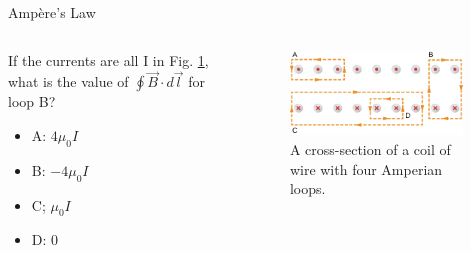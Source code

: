 \documentclass{beamer}
\begin{document}
\begin{frame}{Amp\`{e}re's Law}
\begin{columns}[T]
\begin{column}{0.5\textwidth}
\small
If the currents are all I in Fig. \ref{fig:ampQuestion3}, what is the value of $\oint \vec{B} \cdot d\vec{l}$ for loop B?
\begin{itemize}
\item A: $4\mu_0 I$
\item B: $-4\mu_0 I$
\item C; $\mu_0 I$
\item D: $0$
\end{itemize}
\end{column}
\begin{column}{0.5\textwidth}
\begin{figure}
\centering
\includegraphics[width=0.95\textwidth]{figures/ampQuestion1.jpeg}
\caption{\label{fig:ampQuestion3} A cross-section of a coil of wire with four Amperian loops.}
\end{figure}
\end{column}
\end{columns}
\end{frame}
\end{document}
